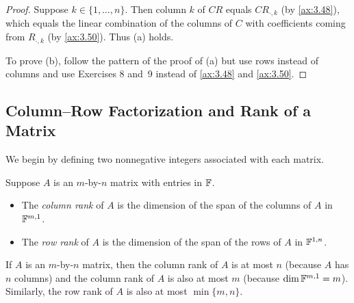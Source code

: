 \begin{proof}
Suppose $k\in\{1,\dots,n\}$. Then column $k$ of $CR$ equals $CR_{\cdot,k}$ (by
\ref{ax:3.48}), which equals the linear combination of the columns of $C$ with
coefficients coming from $R_{\cdot,k}$ (by \ref{ax:3.50}). Thus (a) holds.

To prove (b), follow the pattern of the proof of (a) but use rows instead of
columns and use Exercises 8 and~9 instead of \ref{ax:3.48} and \ref{ax:3.50}.
\end{proof}

\subsection{Column--Row Factorization and Rank of a Matrix}

We begin by defining two nonnegative integers associated with each matrix.

\begin{definition}\label{ax:3.52}
Suppose $A$ is an $m$-by-$n$ matrix with entries in $\mathbb{F}$.
\begin{itemize}
\item The \emph{column rank} of $A$ is the dimension of the span of the columns
  of $A$ in $\mathbb{F}^{m,1}$.
\item The \emph{row rank} of $A$ is the dimension of the span of the rows of
  $A$ in $\mathbb{F}^{1,n}$.
\end{itemize}
\end{definition}

If $A$ is an $m$-by-$n$ matrix, then the column rank of $A$ is at most $n$
(because $A$ has $n$ columns) and the column rank of $A$ is also at most $m$
(because $\operatorname{dim}\mathbb{F}^{m,1}=m$). Similarly, the row rank of $A$ is also at most
$\min\{m,n\}$.

